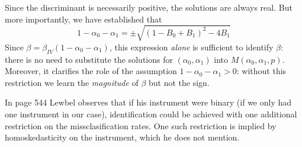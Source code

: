 Since the discriminant is necessarily positive, the solutions are always real.
But more importantly, we have established that
\begin{equation*}
  1 - \alpha_0 - \alpha_1 = \pm \sqrt{(1 - B_0 + B_1)^2 - 4 B_1 }
\end{equation*}
Since $\beta = \beta_{IV} (1 - \alpha_0 - \alpha_1)$, this expression \emph{alone} is sufficient to identify $\beta$: there is no need to substitute the solutions for $(\alpha_0, \alpha_1)$ into $M(\alpha_0, \alpha_1, p)$.
Moreover, it clarifies the role of the assumption $1 - \alpha_0 - \alpha_1>0$: without this restriction we learn the \emph{magnitude} of $\beta$ but not the sign.


In page 544 Lewbel observes that if his instrument were binary (if
we only had one instrument in our case), identification could be achieved
with one additional restriction on the missclasification rates. One
such restriction is implied by homoskedasticity on the instrument,
which he does not mention. 

